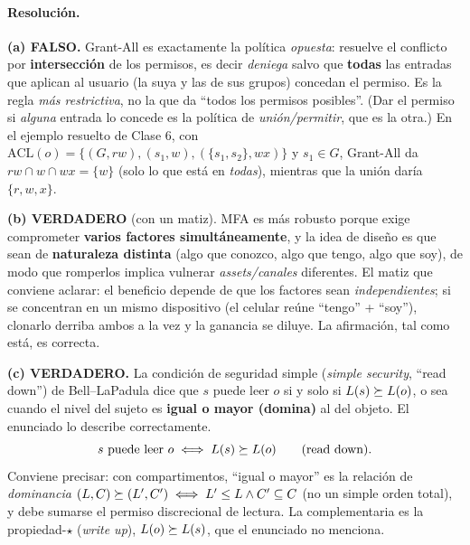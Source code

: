 \paragraph{Resolución.}

\textbf{(a) FALSO.} Grant-All es exactamente la política \emph{opuesta}: resuelve el conflicto por
\textbf{intersección} de los permisos, es decir \emph{deniega} salvo que \textbf{todas} las
entradas que aplican al usuario (la suya y las de sus grupos) concedan el permiso. Es la regla
\emph{más restrictiva}, no la que da ``todos los permisos posibles''. (Dar el permiso si
\emph{alguna} entrada lo concede es la política de \emph{unión/permitir}, que es la otra.) En el
ejemplo resuelto de Clase 6, con $\mathrm{ACL}(o)=\{(G,rw),(s_1,w),(\{s_1,s_2\},wx)\}$ y
$s_1\in G$, Grant-All da $rw \cap w \cap wx = \{w\}$ (solo lo que está en \emph{todas}), mientras
que la unión daría $\{r,w,x\}$.

\medskip
\textbf{(b) VERDADERO} (con un matiz). MFA es más robusto porque exige comprometer \textbf{varios
factores simultáneamente}, y la idea de diseño es que sean de \textbf{naturaleza distinta} (algo
que conozco, algo que tengo, algo que soy), de modo que romperlos implica vulnerar
\emph{assets/canales} diferentes. El matiz que conviene aclarar: el beneficio depende de que los
factores sean \emph{independientes}; si se concentran en un mismo dispositivo (el celular reúne
``tengo'' + ``soy''), clonarlo derriba ambos a la vez y la ganancia se diluye. La afirmación, tal
como está, es correcta.

\medskip
\textbf{(c) VERDADERO.} La condición de seguridad simple (\emph{simple security}, ``read down'')
de Bell--LaPadula dice que $s$ puede leer $o$ si y solo si $L(s) \succeq L(o)$, o sea cuando el nivel
del sujeto es \textbf{igual o mayor (domina)} al del objeto. El enunciado lo describe
correctamente.
\begin{equation*}
  s \text{ puede leer } o \iff L(s) \succeq L(o) \qquad (\text{read down}).
\end{equation*}
Conviene precisar: con compartimentos, ``igual o mayor'' es la relación de \emph{dominancia}
$(L,C)\succeq(L',C') \iff L'\le L \wedge C'\subseteq C$ (no un simple orden total), y debe sumarse el
permiso discrecional de lectura. La complementaria es la propiedad-$\star$ (\emph{write up}),
$L(o)\succeq L(s)$, que el enunciado no menciona.

